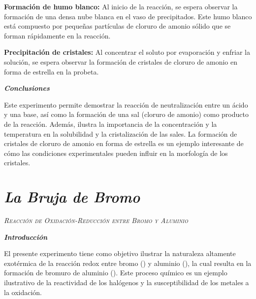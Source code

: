     \textbf{Formación de humo blanco:} Al inicio de la reacción, se espera observar la formación de una densa nube blanca en el vaso de precipitados. Este humo blanco está compuesto por pequeñas partículas de cloruro de amonio sólido que se forman rápidamente en la reacción.   
    
    \textbf{Precipitación de cristales:} Al concentrar el soluto por evaporación y enfriar la solución, se espera observar la formación de cristales de cloruro de amonio en forma de estrella en la probeta.   
    
    \textit{\textbf{Conclusiones}}   
    
    Este experimento permite demostrar la reacción de neutralización entre un ácido y una base, así como la formación de una sal (cloruro de amonio) como producto de la reacción. Además, ilustra la importancia de la concentración y la temperatura en la solubilidad y la cristalización de las sales. La formación de cristales de cloruro de amonio en forma de estrella es un ejemplo interesante de cómo las condiciones experimentales pueden influir en la morfología de los cristales.
    \newpage
\section{\textit{\textbf{La Bruja de Bromo}}}
\textit{\textsc{Reacción de Oxidación-Reducción entre Bromo y Aluminio}}  

    \textit{\textbf{Introducción }} 
    
    El presente experimento tiene como objetivo ilustrar la naturaleza altamente exotérmica de la reacción redox entre bromo () y aluminio (), la cual resulta en la formación de bromuro de aluminio (). Este proceso químico es un ejemplo ilustrativo de la reactividad de los halógenos y la susceptibilidad de los metales a la oxidación.  
    
